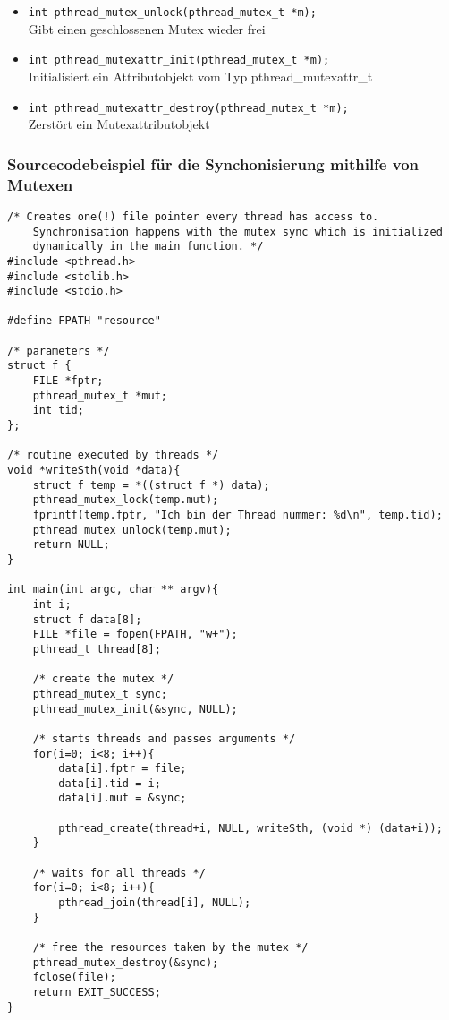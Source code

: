 \documentclass[11pt,a4paper]{article}
\begin{document}
\begin{itemize}
\item \lstinline$int pthread_mutex_unlock(pthread_mutex_t *m);$ \\
Gibt einen geschlossenen Mutex wieder frei

\item \lstinline$int pthread_mutexattr_init(pthread_mutex_t *m);$ \\
Initialisiert ein Attributobjekt vom Typ pthread\_mutexattr\_t

\item \lstinline$int pthread_mutexattr_destroy(pthread_mutex_t *m);$ \\
Zerstört ein Mutexattributobjekt

\end{itemize}

\subsubsection{Sourcecodebeispiel für die Synchonisierung mithilfe von Mutexen}
\begin{lstlisting}[name=Mutex]
/* Creates one(!) file pointer every thread has access to. 
	Synchronisation happens with the mutex sync which is initialized
	dynamically in the main function. */
#include <pthread.h>
#include <stdlib.h>
#include <stdio.h>

#define FPATH "resource"

/* parameters */
struct f {
	FILE *fptr;
	pthread_mutex_t *mut;
	int tid;
};

/* routine executed by threads */
void *writeSth(void *data){
	struct f temp = *((struct f *) data);	
	pthread_mutex_lock(temp.mut);
	fprintf(temp.fptr, "Ich bin der Thread nummer: %d\n", temp.tid);
	pthread_mutex_unlock(temp.mut);
	return NULL;
}

int main(int argc, char ** argv){
	int i;
	struct f data[8];
	FILE *file = fopen(FPATH, "w+");
	pthread_t thread[8];

	/* create the mutex */
	pthread_mutex_t sync; 
	pthread_mutex_init(&sync, NULL);

	/* starts threads and passes arguments */
	for(i=0; i<8; i++){
		data[i].fptr = file;
		data[i].tid = i;
		data[i].mut = &sync;

		pthread_create(thread+i, NULL, writeSth, (void *) (data+i));
	}

	/* waits for all threads */
	for(i=0; i<8; i++){
		pthread_join(thread[i], NULL);
	}

	/* free the resources taken by the mutex */
	pthread_mutex_destroy(&sync);
	fclose(file);
	return EXIT_SUCCESS;
}
\end{lstlisting}
\end{document}
